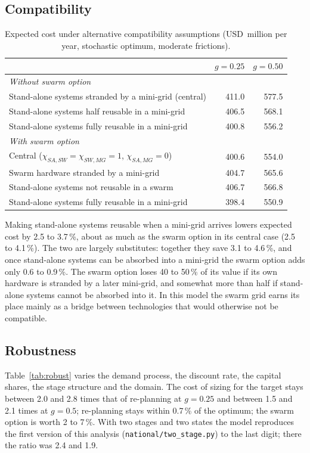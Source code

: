 \documentclass[11pt,a4paper]{article}
\newcommand{\musd}{USD~million}
\begin{document}
\subsection{Compatibility}
\begin{table}[!ht]\centering\small
\caption{Expected cost under alternative compatibility assumptions (\musd{} per year, stochastic optimum,
moderate frictions).}\label{tab:compat}
\begin{tabular}{lrr}\toprule
 & $g=0.25$ & $g=0.50$\\\midrule
\multicolumn{3}{l}{\emph{Without swarm option}}\\
Stand-alone systems stranded by a mini-grid (central) & 411.0 & 577.5\\
Stand-alone systems half reusable in a mini-grid & 406.5 & 568.1\\
Stand-alone systems fully reusable in a mini-grid & 400.8 & 556.2\\\midrule
\multicolumn{3}{l}{\emph{With swarm option}}\\
Central ($\chi_{SA,SW}=\chi_{SW,MG}=1$, $\chi_{SA,MG}=0$) & 400.6 & 554.0\\
Swarm hardware stranded by a mini-grid & 404.7 & 565.6\\
Stand-alone systems not reusable in a swarm & 406.7 & 566.8\\
Stand-alone systems fully reusable in a mini-grid & 398.4 & 550.9\\\bottomrule
\end{tabular}
\end{table}
Making stand-alone systems reusable when a mini-grid arrives lowers expected cost by 2.5 to 3.7\,\%, about as much
as the swarm option in its central case (2.5 to 4.1\,\%). The two are largely substitutes: together they save 3.1
to 4.6\,\%, and once stand-alone systems can be absorbed into a mini-grid the swarm option adds only 0.6 to
0.9\,\%. The swarm option loses 40 to 50\,\% of its value if its own hardware is stranded by a later mini-grid, and
somewhat more than half if stand-alone systems cannot be absorbed into it. In this model the swarm grid earns its place
mainly as a bridge between technologies that would otherwise not be compatible.

\subsection{Robustness}\label{sec:robust}
Table~\ref{tab:robust} varies the demand process, the discount rate, the capital shares, the stage structure and
the domain. The cost of sizing for the target stays between 2.0 and 2.8 times that of re-planning at $g=0.25$ and
between 1.5 and 2.1 times at $g=0.5$; re-planning stays within 0.7\,\% of the optimum; the swarm option is worth 2
to 7\,\%. With two stages and two states the model reproduces the first version of this analysis
(\texttt{national/two\_stage.py}) to the last digit; there the ratio was 2.4 and 1.9.
\end{document}
